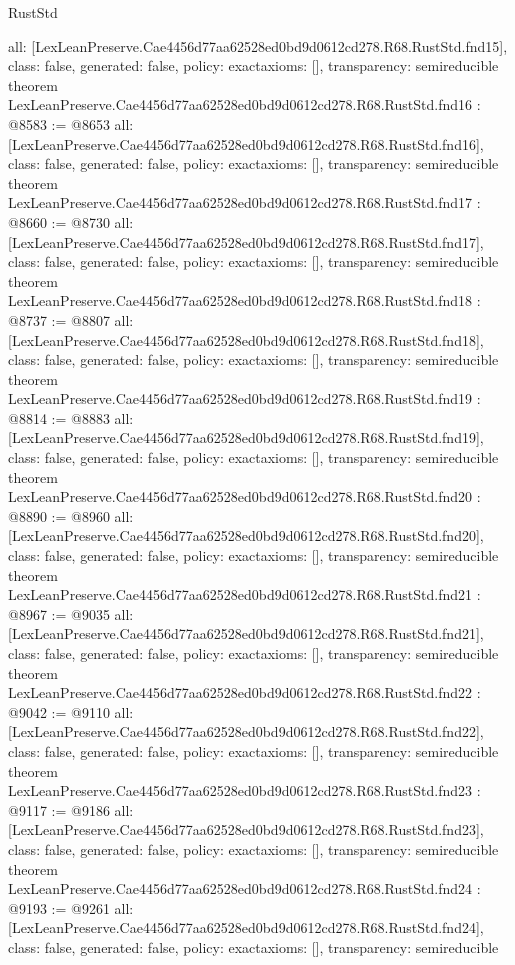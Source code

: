 \begin{lexlean}{RustStd}
\begin{coremodule}
{  all: [LexLeanPreserve.Cae4456d77aa62528ed0bd9d0612cd278.R68.RustStd.fnd15],
  class: false,
  generated: false,
  policy: exact{axioms: []},
  transparency: semireducible
}
theorem LexLeanPreserve.Cae4456d77aa62528ed0bd9d0612cd278.R68.RustStd.fnd16 : @8583 := @8653 {
  all: [LexLeanPreserve.Cae4456d77aa62528ed0bd9d0612cd278.R68.RustStd.fnd16],
  class: false,
  generated: false,
  policy: exact{axioms: []},
  transparency: semireducible
}
theorem LexLeanPreserve.Cae4456d77aa62528ed0bd9d0612cd278.R68.RustStd.fnd17 : @8660 := @8730 {
  all: [LexLeanPreserve.Cae4456d77aa62528ed0bd9d0612cd278.R68.RustStd.fnd17],
  class: false,
  generated: false,
  policy: exact{axioms: []},
  transparency: semireducible
}
theorem LexLeanPreserve.Cae4456d77aa62528ed0bd9d0612cd278.R68.RustStd.fnd18 : @8737 := @8807 {
  all: [LexLeanPreserve.Cae4456d77aa62528ed0bd9d0612cd278.R68.RustStd.fnd18],
  class: false,
  generated: false,
  policy: exact{axioms: []},
  transparency: semireducible
}
theorem LexLeanPreserve.Cae4456d77aa62528ed0bd9d0612cd278.R68.RustStd.fnd19 : @8814 := @8883 {
  all: [LexLeanPreserve.Cae4456d77aa62528ed0bd9d0612cd278.R68.RustStd.fnd19],
  class: false,
  generated: false,
  policy: exact{axioms: []},
  transparency: semireducible
}
theorem LexLeanPreserve.Cae4456d77aa62528ed0bd9d0612cd278.R68.RustStd.fnd20 : @8890 := @8960 {
  all: [LexLeanPreserve.Cae4456d77aa62528ed0bd9d0612cd278.R68.RustStd.fnd20],
  class: false,
  generated: false,
  policy: exact{axioms: []},
  transparency: semireducible
}
theorem LexLeanPreserve.Cae4456d77aa62528ed0bd9d0612cd278.R68.RustStd.fnd21 : @8967 := @9035 {
  all: [LexLeanPreserve.Cae4456d77aa62528ed0bd9d0612cd278.R68.RustStd.fnd21],
  class: false,
  generated: false,
  policy: exact{axioms: []},
  transparency: semireducible
}
theorem LexLeanPreserve.Cae4456d77aa62528ed0bd9d0612cd278.R68.RustStd.fnd22 : @9042 := @9110 {
  all: [LexLeanPreserve.Cae4456d77aa62528ed0bd9d0612cd278.R68.RustStd.fnd22],
  class: false,
  generated: false,
  policy: exact{axioms: []},
  transparency: semireducible
}
theorem LexLeanPreserve.Cae4456d77aa62528ed0bd9d0612cd278.R68.RustStd.fnd23 : @9117 := @9186 {
  all: [LexLeanPreserve.Cae4456d77aa62528ed0bd9d0612cd278.R68.RustStd.fnd23],
  class: false,
  generated: false,
  policy: exact{axioms: []},
  transparency: semireducible
}
theorem LexLeanPreserve.Cae4456d77aa62528ed0bd9d0612cd278.R68.RustStd.fnd24 : @9193 := @9261 {
  all: [LexLeanPreserve.Cae4456d77aa62528ed0bd9d0612cd278.R68.RustStd.fnd24],
  class: false,
  generated: false,
  policy: exact{axioms: []},
  transparency: semireducible
}
\end{coremodule}
\end{lexlean}
